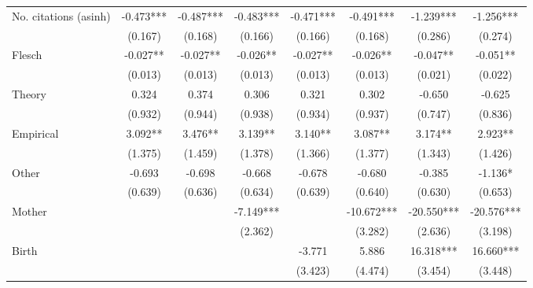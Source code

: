 \begin{table}[H]
\begin{adjustwidth}{-0.085cm}{}
\begin{threeparttable}
\begin{tabular}{p{2.64cm}SSSSSSS}
            No. citations (asinh)         &      -0.473***&      -0.487***&      -0.483***&      -0.471***&      -0.491***&      -1.239***&      -1.256***\\
                                          &     (0.167)   &     (0.168)   &     (0.166)   &     (0.166)   &     (0.168)   &     (0.286)   &     (0.274)   \\
            Flesch                        &      -0.027** &      -0.027** &      -0.026** &      -0.027** &      -0.026** &      -0.047** &      -0.051** \\
                                          &     (0.013)   &     (0.013)   &     (0.013)   &     (0.013)   &     (0.013)   &     (0.021)   &     (0.022)   \\
            Theory                        &       0.324   &       0.374   &       0.306   &       0.321   &       0.302   &      -0.650   &      -0.625   \\
                                          &     (0.932)   &     (0.944)   &     (0.938)   &     (0.934)   &     (0.937)   &     (0.747)   &     (0.836)   \\
            Empirical                     &       3.092** &       3.476** &       3.139** &       3.140** &       3.087** &       3.174** &       2.923** \\
                                          &     (1.375)   &     (1.459)   &     (1.378)   &     (1.366)   &     (1.377)   &     (1.343)   &     (1.426)   \\
            Other                         &      -0.693   &      -0.698   &      -0.668   &      -0.678   &      -0.680   &      -0.385   &      -1.136*  \\
                                          &     (0.639)   &     (0.636)   &     (0.634)   &     (0.639)   &     (0.640)   &     (0.630)   &     (0.653)   \\
            Mother                        &               &               &      -7.149***&               &     -10.672***&     -20.550***&     -20.576***\\
                                          &               &               &     (2.362)   &               &     (3.282)   &     (2.636)   &     (3.198)   \\
            Birth                         &               &               &               &      -3.771   &       5.886   &      16.318***&      16.660***\\
                                          &               &               &               &     (3.423)   &     (4.474)   &     (3.454)   &     (3.448)   \\

\end{tabular}
\end{threeparttable}
\end{adjustwidth}
\end{table}
